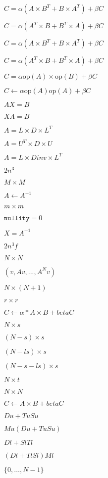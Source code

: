 \documentclass{article}
\begin{document}
$C = \alpha ( A \times B^T + B \times A^T) + \beta C$
\pagebreak

$C = \alpha ( A^T \times B + B^T \times A ) + \beta C$
\pagebreak

$C = \alpha ( A \times B^T + B \times A^T ) + \beta C$
\pagebreak

$C = \alpha ( A^T \times B + B^T \times A) + \beta C$
\pagebreak

$C = \alpha \mathrm{op}(A) \times \mathrm{op}(B) + \beta C$
\pagebreak

$ C \gets \alpha \mathrm{op}(A) \mathrm{op}(A) + \beta C$
\pagebreak

$A X = B$
\pagebreak

$X A = B$
\pagebreak

$ A = L \times D \times  L^T$
\pagebreak

$ A = U^T \times D \times  U$
\pagebreak

$ A = L \times Dinv \times  L^T$
\pagebreak

$2n^3$
\pagebreak

$M \times M$
\pagebreak

$A \gets A^{-1}$
\pagebreak

$ m \times m$
\pagebreak

$ \mathtt{nullity} = 0$
\pagebreak

$X = A^{-1}$
\pagebreak

$2n^3f$
\pagebreak

$ N \times N$
\pagebreak

$(v,Av, ..., A^Nv)$
\pagebreak

$ N \times (N+1)$
\pagebreak

$ r\times r$
\pagebreak

$ C \gets \alpha * A \times B + beta C $
\pagebreak

$ N \times s$
\pagebreak

$ (N - s) \times s$
\pagebreak

$ (N - ls) \times s$
\pagebreak

$ (N - s - ls) \times s$
\pagebreak

$ N \times t$
\pagebreak

$ N \times N $
\pagebreak

$ C \gets A \times B + beta C $
\pagebreak

$ Du + Tu  Su$
\pagebreak

$ Mu (Du + Tu  Su)$
\pagebreak

$ Dl + Sl  Tl $
\pagebreak

$(Dl + Tl Sl) Ml $
\pagebreak

$ \{0,\dots, N-1\}$
\pagebreak
\end{document}
